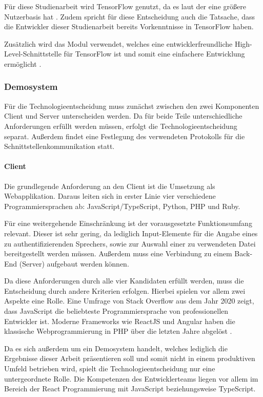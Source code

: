 Für diese Studienarbeit wird TensorFlow genutzt, da es laut der  eine größere Nutzerbasis hat \autocite[vgl.][]{stack_overflow_stack_2022}.
Zudem spricht für diese Entscheidung auch die Tatsache, dass die Entwickler dieser Studienarbeit bereits Vorkenntnisse in TensorFlow haben.

Zusätzlich wird das Modul  verwendet, welches eine entwicklerfreundliche High-Level-Schnittstelle für TensorFlow ist und somit eine einfachere Entwicklung ermöglicht \autocite[vgl.][]{noauthor_keras_2023}.

\subsubsection{Demosystem}
Für die Technologieentscheidung muss zunächst zwischen den zwei Komponenten Client und Server unterscheiden werden.
Da für beide Teile unterschiedliche Anforderungen erfüllt werden müssen, erfolgt die Technologieentscheidung separat.
Außerdem findet eine Festlegung des verwendeten Protokolls für die Schnittstellenkommunikation statt.

\paragraph{Client}
Die grundlegende Anforderung an den Client ist die Umsetzung als Webapplikation.
Daraus leiten sich in erster Linie vier verschiedene Programmiersprachen ab: JavaScript/Type\-Script, Python, PHP und Ruby.

Für eine weitergehende Einschränkung ist der vorausgesetzte Funktionsumfang relevant.
Dieser ist sehr gering, da lediglich Input-Elemente für die Angabe eines zu authentifizierenden Sprechers, sowie zur Auswahl einer zu verwendeten Datei bereitgestellt werden müssen.
Außerdem muss eine Verbindung zu einem Back-End (Server) aufgebaut werden können.

Da diese Anforderungen durch alle vier Kandidaten erfüllt werden, muss die Entscheidung durch andere Kriterien erfolgen.
Hierbei spielen vor allem zwei Aspekte eine Rolle.
Eine Umfrage von Stack Overflow aus dem Jahr 2020 zeigt, dass JavaScript die beliebteste Programmiersprache von professionellen Entwickler ist.
Moderne Frameworks wie ReactJS und Angular haben die klassische Webprogrammierung in PHP über die letzten Jahre abgelöst \autocite[vgl.][]{stack_overflow_stack_2020}.

Da es sich außerdem um ein Demosystem handelt, welches lediglich die Ergebnisse dieser Arbeit präsentieren soll und somit nicht in einem produktiven Umfeld betrieben wird, spielt die Technologieentscheidung nur eine untergeordnete Rolle.
Die Kompetenzen des Entwicklerteams liegen vor allem im Bereich der React Programmierung mit JavaScript beziehungsweise TypeScript.

